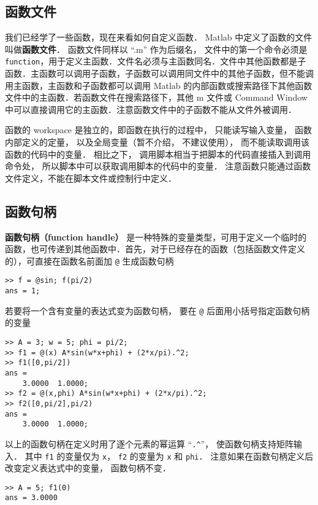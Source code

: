 

\subsection{函数文件}

我们已经学了一些函数，现在来看如何自定义函数． Matlab 中定义了函数的文件叫做\textbf{函数文件}． 函数文件同样以 “.m” 作为后缀名， 文件中的第一个命令必须是 \verb|function|，用于定义主函数．文件名必须与主函数同名．文件中其他函数都是子函数．主函数可以调用子函数，子函数可以调用同文件中的其他子函数，但不能调用主函数，主函数和子函数都可以调用 Matlab 的内部函数或搜索路径下其他函数文件中的主函数．若函数文件在搜索路径下，其他 m 文件或 Command Window 中可以直接调用它的主函数．注意函数文件中的子函数不能从文件外被调用．

函数的 workspace 是独立的，即函数在执行的过程中， 只能读写输入变量， 函数内部定义的定量， 以及全局变量（暂不介绍， 不建议使用）， 而不能读取调用该函数的代码中的变量． 相比之下， 调用脚本相当于把脚本的代码直接插入到调用命令处， 所以脚本中可以获取调用脚本的代码中的变量． 注意函数只能通过函数文件定义，不能在脚本文件或控制行中定义．

\subsection{函数句柄}
\textbf{函数句柄（function handle）} 是一种特殊的变量类型，可用于定义一个临时的函数，也可传递到其他函数中．首先，对于已经存在的函数（包括函数文件定义的），可直接在函数名前面加 \verb|@| 生成函数句柄
\begin{lstlisting}[language=matlabC]
>> f = @sin; f(pi/2)
ans = 1;
\end{lstlisting}
若要将一个含有变量的表达式变为函数句柄， 要在 \verb|@| 后面用小括号指定函数句柄的变量
\begin{lstlisting}[language=matlabC]
>> A = 3; w = 5; phi = pi/2;
>> f1 = @(x) A*sin(w*x+phi) + (2*x/pi).^2;
>> f1([0,pi/2])
ans =
    3.0000  1.0000;
>> f2 = @(x,phi) A*sin(w*x+phi) + (2*x/pi).^2;
>> f2([0,pi/2],pi/2)
ans =
    3.0000  1.0000;
\end{lstlisting}
以上的函数句柄在定义时用了逐个元素的幂运算 “\verb|.^|”， 使函数句柄支持矩阵输入． 其中 \verb|f1| 的变量仅为 \verb|x|， \verb|f2| 的变量为 \verb|x| 和 \verb|phi|． 注意如果在函数句柄定义后改变定义表达式中的变量， 函数句柄不变．
\begin{lstlisting}[language=matlabC]
>> A = 5; f1(0)
ans = 3.0000
\end{lstlisting}

